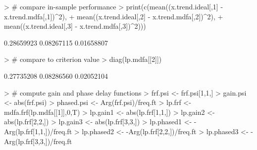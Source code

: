 \documentclass[a4paper]{book}
\begin{document}
\begin{Schunk}
\begin{Sinput}
> # compare in-sample performance
> print(c(mean((x.trend.ideal[,1] - x.trend.mdfa[,1])^2),
+ 	mean((x.trend.ideal[,2] - x.trend.mdfa[,2])^2),
+ 	mean((x.trend.ideal[,3] - x.trend.mdfa[,3])^2)))
\end{Sinput}
\begin{Soutput}
[1] 0.28659923 0.08267115 0.01658807
\end{Soutput}
\begin{Sinput}
> # compare to criterion value
> diag(lp.mdfa[[2]])
\end{Sinput}
\begin{Soutput}
[1] 0.27735208 0.08286560 0.02052104
\end{Soutput}
\begin{Sinput}
> # compute gain and phase delay functions
> frf.psi <- frf.psi[1,1,]
> gain.psi <- abs(frf.psi)
> phased.psi <- Arg(frf.psi)/freq.ft
> lp.frf <- mdfa.frf(lp.mdfa[[1]],0,T)
> lp.gain1 <- abs(lp.frf[1,1,])
> lp.gain2 <- abs(lp.frf[2,2,])
> lp.gain3 <- abs(lp.frf[3,3,])
> lp.phased1 <- -Arg(lp.frf[1,1,])/freq.ft
> lp.phased2 <- -Arg(lp.frf[2,2,])/freq.ft
> lp.phased3 <- -Arg(lp.frf[3,3,])/freq.ft
\end{Sinput}
\end{Schunk}
\end{document}
